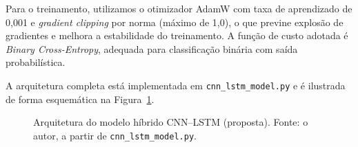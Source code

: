 Para o treinamento, utilizamos o otimizador AdamW com taxa de aprendizado de 0,001 e \emph{gradient clipping} por norma (máximo de 1,0), o que previne explosão de gradientes e melhora a estabilidade do treinamento.
A função de custo adotada é \emph{Binary Cross-Entropy}, adequada para classificação binária com saída probabilística.

A arquitetura completa está implementada em \texttt{cnn\_lstm\_model.py} e é ilustrada de forma esquemática na Figura~\ref{fig:arquitetura-cnn-lstm}.

\begin{figure}[H]
  \centering
  \caption{Arquitetura do modelo híbrido CNN--LSTM (proposta). Fonte: o autor, a partir de \texttt{cnn\_lstm\_model.py}.}
  \label{fig:arquitetura-cnn-lstm}
\end{figure}

